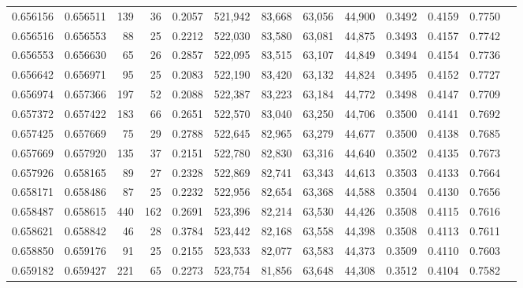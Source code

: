 \begin{tabular}{rrrrrrrrrrrrr}
0.656156 & 0.656511 &   139 &  36 &                                     0.2057 & 521,942 &  83,668 &  63,056 &  44,900 & 0.3492 & 0.4159 & 0.7750 \\
0.656516 & 0.656553 &    88 &  25 &                                     0.2212 & 522,030 &  83,580 &  63,081 &  44,875 & 0.3493 & 0.4157 & 0.7742 \\
0.656553 & 0.656630 &    65 &  26 &                                     0.2857 & 522,095 &  83,515 &  63,107 &  44,849 & 0.3494 & 0.4154 & 0.7736 \\
0.656642 & 0.656971 &    95 &  25 &                                     0.2083 & 522,190 &  83,420 &  63,132 &  44,824 & 0.3495 & 0.4152 & 0.7727 \\
0.656974 & 0.657366 &   197 &  52 &                                     0.2088 & 522,387 &  83,223 &  63,184 &  44,772 & 0.3498 & 0.4147 & 0.7709 \\
0.657372 & 0.657422 &   183 &  66 &                                     0.2651 & 522,570 &  83,040 &  63,250 &  44,706 & 0.3500 & 0.4141 & 0.7692 \\
0.657425 & 0.657669 &    75 &  29 &                                     0.2788 & 522,645 &  82,965 &  63,279 &  44,677 & 0.3500 & 0.4138 & 0.7685 \\
0.657669 & 0.657920 &   135 &  37 &                                     0.2151 & 522,780 &  82,830 &  63,316 &  44,640 & 0.3502 & 0.4135 & 0.7673 \\
0.657926 & 0.658165 &    89 &  27 &                                     0.2328 & 522,869 &  82,741 &  63,343 &  44,613 & 0.3503 & 0.4133 & 0.7664 \\
0.658171 & 0.658486 &    87 &  25 &                                     0.2232 & 522,956 &  82,654 &  63,368 &  44,588 & 0.3504 & 0.4130 & 0.7656 \\
0.658487 & 0.658615 &   440 & 162 &                                     0.2691 & 523,396 &  82,214 &  63,530 &  44,426 & 0.3508 & 0.4115 & 0.7616 \\
0.658621 & 0.658842 &    46 &  28 &                                     0.3784 & 523,442 &  82,168 &  63,558 &  44,398 & 0.3508 & 0.4113 & 0.7611 \\
0.658850 & 0.659176 &    91 &  25 &                                     0.2155 & 523,533 &  82,077 &  63,583 &  44,373 & 0.3509 & 0.4110 & 0.7603 \\
0.659182 & 0.659427 &   221 &  65 &                                     0.2273 & 523,754 &  81,856 &  63,648 &  44,308 & 0.3512 & 0.4104 & 0.7582 \\

\end{tabular}
